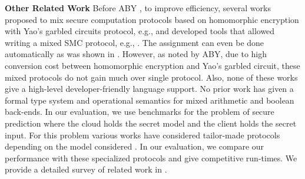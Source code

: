 %
%
%
%
%
%
%
%
%
%




\vspace{10pt}

\noindent\textbf{Other Related Work} 
Before ABY \cite{aby}, to improve efficiency, several works proposed
to mix secure computation protocols based on homomorphic
encryption with Yao’s garbled circuits protocol, e.g., \cite{barni,blanton,brickell,franz,huang,valeriaMatrix,valeriaRidge,schropferK11}
  and developed tools that allowed writing a mixed SMC protocol, e.g., \cite{bogdanov,lone,tasty}. The assignment can
even be done automatically as was shown in \cite{autoS}. 
However, as noted by ABY, due to high conversion cost between homomorphic encryption and Yao's garbled circuit, these mixed protocols do not gain much over single protocol. Also, none of these works give a high-level developer-friendly language support.
No prior work has given a formal type system and operational semantics for mixed arithmetic and boolean back-ends.
In our evaluation, we use benchmarks for the problem of secure prediction where the cloud holds the secret model and the client holds the secret input. For this problem various works have considered tailor-made protocols depending on the model considered \cite{shafindss,wu,secureml,minionn}. In our evaluation, we compare our performance with these specialized protocols and give competitive run-times. We provide a detailed survey of related work in .
